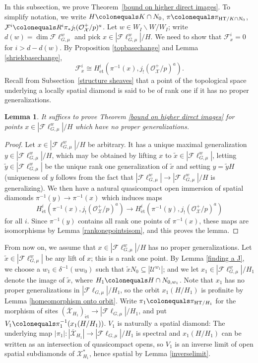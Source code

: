 \documentclass{amsart}
\newtheorem{lemma}[subsubsection]{Lemma}
\theoremstyle{remark}
\numberwithin{equation}{subsection}
\newcommand{\cF}{{\mathcal F}}
\newcommand{\cO}{{\mathcal O}}
\newcommand{\cU}{{\mathcal U}}
\newcommand{\cX}{{\mathcal X}}
\newcommand{\HT}{\mathrm{HT}}
\newcommand{\et}{\mathrm{\acute{e}t}}
\newcommand{\Fl}{\mathscr{F}\!\ell}
\newcommand{\ocX}{\overline{\mathcal{X}}}
\newcommand{\wt}{\widetilde}
\newcommand{\sub}{\subseteq}
\newcommand{\defeq}{\colonequals}
\renewcommand{\(}{\left(}
\renewcommand{\)}{\right)}
\begin{document}
In this subsection, we prove Theorem~\ref{bound on higher direct images}. To simplify notation, we write $H \defeq K \cap N_{0}$, $\pi \defeq \pi_{\HT/K \cap N_0}$, $\cF^{i} \defeq R^{i}\pi_{\ast}j_{!}(\cO_{\cX}^{+}/p)^{a}$. Let $w\in W_{I}\backslash W /W_{I}$; write $d(w)=\dim \Fl_{G,\mu}^{w}$ and pick $x\in |\Fl_{G,\mu}^{w}|/H$. We need to show that $\cF^{i}_{x}=0$ for $i > d-d(w)$. By Proposition \ref{topbasechange} and Lemma \ref{shriekbasechange},
\[
 \cF_{x}^{i} \cong H^{i}_{\et}(\pi^{-1}(x), j_{!}(\cO_{\cX}^{+}/p)^{a}). 
 \]
Recall from Subsection~\ref{structure sheaves} that a point of the topological space underlying a locally spatial diamond is said to be of rank one if it has no proper generalizations.

\begin{lemma}\label{reduction to rank one}
It suffices to prove Theorem \ref{bound on higher direct images} for points $x\in |\Fl_{G,\mu}^{w}|/H$ which have no proper generalizations.
\end{lemma}

\begin{proof}
Let $x\in|\Fl_{G,\mu}^{w}|/H$ be arbitrary. It has a unique maximal generalization $y\in |\Fl_{G,\mu}^{w}|/H$, which may be obtained by lifting $x$ to $\wt{x}\in |\Fl_{G,\mu}^{w}|$, letting $\wt{y}\in |\Fl_{G,\mu}^{w}|$ be the unique rank one generalization of $\wt{x}$ and setting $y=\wt{y}H$ (uniqueness of $y$ follows from the fact that $|\Fl_{G,\mu}^{w}| \to |\Fl_{G,\mu}^{w}|/H$ is generalizing). We then have a natural quasicompact open immersion of spatial diamonds $\pi^{-1}(y) \to \pi^{-1}(x)$ which induces maps
\[
 H^{i}_{\et}(\pi^{-1}(x), j_{!}(\cO_{\cX}^{+}/p)^{a}) \to H^{i}_{\et}(\pi^{-1}(y), j_{!}(\cO_{\cX}^{+}/p)^{a})
 \]
for all $i$. Since $\pi^{-1}(y)$ contains all rank one points of $\pi^{-1}(x)$, these maps are isomorphisms by Lemma \ref{rankonepointsisom}, and this proves the lemma.
\end{proof}

\noindent From now on, we assume that $x\in |\Fl_{G,\mu}^{w}|/H$ has no proper generalizations. Let $\wt{x}\in |\Fl_{G,\mu}^{w}|$ be any lift of $x$; this is a rank one point. By Lemma \ref{finding a J}, we choose a $w_1 \in \delta^{-1}(ww_{0})$ such that $\wt{x}N_{0} \sub |\cU^{w_1}|$; and we let $x_{1}\in |\Fl_{G,\mu}^{w}|/H_{1}$ denote the image of $\wt{x}$, where $H_{1} \defeq H \cap N_{0,w_1}$. Note that $x_1$ has no proper generalizations in $|\Fl_{G,\mu}|/H_1$, so the orbit $x_1(H/H_1)$ is profinite by Lemma \ref{homeomorphism onto orbit}. Write $\pi_1 \defeq \pi_{\HT/H_1}$ for the morphism of sites $(\ocX_{H_1})_{\et} \to |\Fl_{G,\mu}|/H_1$, and put $V_1 \defeq \pi_{1}^{-1}(x_1(H/H_1))$. $V_1$ is naturally a spatial diamond: The underlying map $|\pi_1| \colon |\ocX_{H_1}| \to |\Fl_{G,\mu}|/H_1$ is spectral and $x_1(H/H_1)$ can be written as an intersection of quasicompact opens, so $V_1$ is an inverse limit of open spatial subdiamonds of $\cX_{H_1}^{\ast}$, hence spatial by Lemma \ref{inverselimit}.
\end{document}
